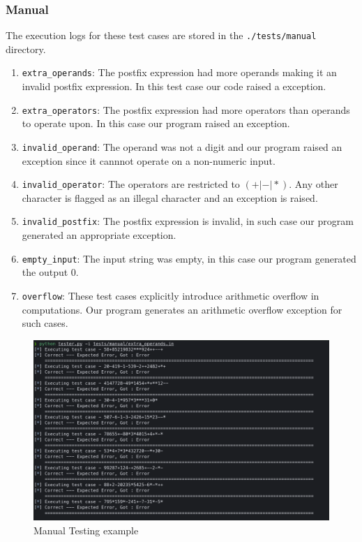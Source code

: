 \documentclass[hidelinks,12pt]{article}
\begin{document}
\subsubsection{Manual}
The execution logs for these test cases are stored in the \verb|./tests/manual| directory.
\begin{enumerate}
    \item \verb|extra_operands|: The postfix expression had more operands making it an invalid postfix expression. In this test case our code raised a exception.
    \item \verb|extra_operators|: The postfix expression had more operators than operands to operate upon. In this case our program raised an exception.
    \item \verb|invalid_operand|: The operand was not a digit and our program raised an exception since it cannnot operate on a non-numeric input.
    \item \verb|invalid_operator|: The operators are restricted to $(+|-|*)$. Any other character is flagged as an illegal character and an exception is raised.
    \item \verb|invalid_postfix|: The postfix expression is invalid, in such case our program generated an appropriate exception.
    \item \verb|empty_input|: The input string was empty, in this case our program generated the output $0$.
    \item \verb|overflow|: These test cases explicitly introduce arithmetic overflow in computations. Our program generates an arithmetic overflow exception for such cases.
\end{enumerate}

\begin{figure}[h!]
    \includegraphics[width=\linewidth]{manual_logs.png}
    \caption{Manual Testing example}
    \label{fig:Testing}
\end{figure}
\end{document}
